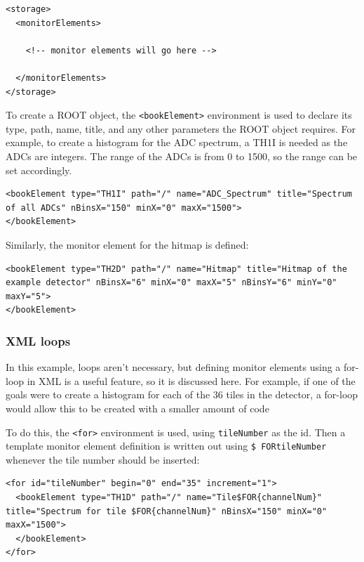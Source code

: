 \begin{lstlisting}
<storage>
  <monitorElements>

    <!-- monitor elements will go here -->

  </monitorElements>
</storage>
\end{lstlisting}

To create a ROOT object, the \texttt{<bookElement>} environment is used to declare its type, path, name, title, and any other parameters the ROOT object requires. For example, to create a histogram for the \acrshort{ADC} spectrum, a TH1I is needed as the \acrshort{ADC}s are integers. The range of the \acrshort{ADC}s is from 0 to 1500, so the range can be set accordingly.

\begin{lstlisting}
<bookElement type="TH1I" path="/" name="ADC_Spectrum" title="Spectrum of all ADCs" nBinsX="150" minX="0" maxX="1500">
</bookElement>
\end{lstlisting}

Similarly, the monitor element for the hitmap is defined:

\begin{lstlisting}
<bookElement type="TH2D" path="/" name="Hitmap" title="Hitmap of the example detector" nBinsX="6" minX="0" maxX="5" nBinsY="6" minY="0" maxY="5">
</bookElement>
\end{lstlisting}

\subsubsection{XML loops}
In this example, loops aren't necessary, but defining monitor elements using a for-loop in \acrshort{XML} is a useful feature, so it is discussed here. For example, if one of the goals were to create a histogram for each of the 36 tiles in the detector, a for-loop would allow this to be created with a smaller amount of code

To do this, the \texttt{<for>} environment is used, using \texttt{tileNumber} as the id. Then a template monitor element definition is written out using \texttt{\$ FOR{tileNumber}} whenever the tile number should be inserted:

\begin{lstlisting}
<for id="tileNumber" begin="0" end="35" increment="1">
  <bookElement type="TH1D" path="/" name="Tile$FOR{channelNum}" title="Spectrum for tile $FOR{channelNum}" nBinsX="150" minX="0" maxX="1500">
  </bookElement>
</for>
\end{lstlisting}


